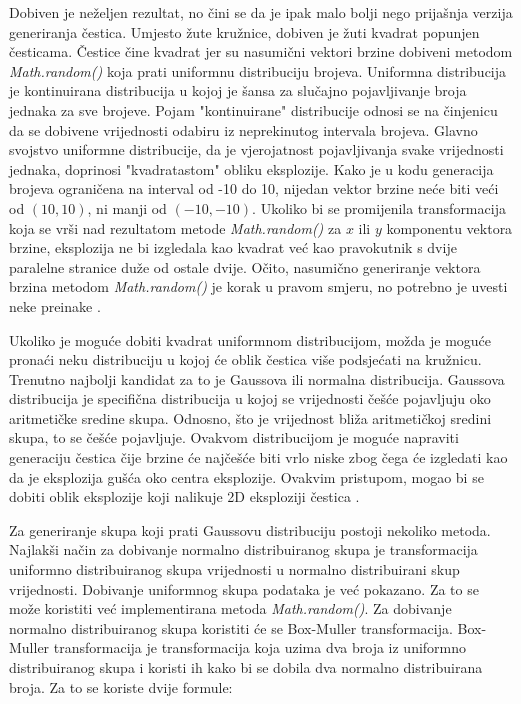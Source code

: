 \documentclass{foi}
\begin{document}
Dobiven je neželjen rezultat, no čini se da je ipak malo bolji nego prijašnja verzija generiranja čestica. Umjesto žute kružnice, dobiven je žuti kvadrat popunjen česticama. Čestice čine kvadrat jer su nasumični vektori brzine dobiveni metodom \textit{Math.random()} koja prati uniformnu distribuciju brojeva. Uniformna distribucija je kontinuirana distribucija u kojoj je šansa za slučajno pojavljivanje broja jednaka za sve brojeve. Pojam "kontinuirane" distribucije odnosi se na činjenicu da se dobivene vrijednosti odabiru iz neprekinutog intervala brojeva. Glavno svojstvo uniformne distribucije, da je vjerojatnost pojavljivanja svake vrijednosti jednaka, doprinosi "kvadratastom" obliku eksplozije. Kako je u kodu generacija brojeva ograničena na interval od -10 do 10, nijedan vektor brzine neće biti veći od $(10,10)$, ni manji od $(-10,-10)$. Ukoliko bi se promijenila transformacija koja se vrši nad rezultatom metode \textit{Math.random()} za $x$ ili $y$ komponentu vektora brzine, eksplozija ne bi izgledala kao kvadrat već kao pravokutnik s dvije paralelne stranice duže od ostale dvije. Očito, nasumično generiranje vektora brzina metodom \textit{Math.random()} je korak u pravom smjeru, no potrebno je uvesti neke preinake \parencite{LibreTextsUniform2024}. 

Ukoliko je moguće dobiti kvadrat uniformnom distribucijom, možda je moguće pronaći neku distribuciju u kojoj će oblik čestica više podsjećati na kružnicu. Trenutno najbolji kandidat za to je Gaussova ili normalna distribucija. Gaussova distribucija je specifična distribucija u kojoj se vrijednosti češće pojavljuju oko aritmetičke sredine skupa. Odnosno, što je vrijednost bliža aritmetičkoj sredini skupa, to se češće pojavljuje. Ovakvom distribucijom je moguće napraviti generaciju čestica čije brzine će najčešće biti vrlo niske zbog čega će izgledati kao da je eksplozija gušća oko centra eksplozije. Ovakvim pristupom, mogao bi se dobiti oblik eksplozije koji nalikuje 2D eksploziji čestica \parencite{DeepAIGaussian2024}.

Za generiranje skupa koji prati Gaussovu distribuciju postoji nekoliko metoda. Najlakši način za dobivanje normalno distribuiranog skupa je transformacija uniformno distribuiranog skupa vrijednosti u normalno distribuirani skup vrijednosti. Dobivanje uniformnog skupa podataka je već pokazano. Za to se može koristiti već implementirana metoda \textit{Math.random()}. Za dobivanje normalno distribuiranog skupa koristiti će se Box-Muller transformacija. Box-Muller transformacija je transformacija koja uzima dva broja iz uniformno distribuiranog skupa i koristi ih kako bi se dobila dva normalno distribuirana broja. Za to se koriste dvije formule:
\end{document}
